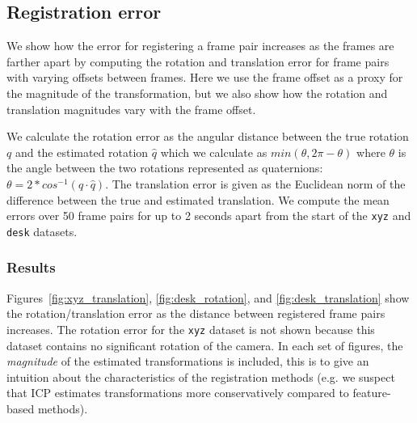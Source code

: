 \documentclass[a4paper]{article}
\begin{document}
\subsection{Registration error}
\label{registration_error}

We show how the error for registering a frame pair increases as the frames are farther apart by computing the rotation and translation error for frame pairs with varying offsets between frames. Here we use the frame offset as a proxy for the magnitude of the transformation, but we also show how the rotation and translation magnitudes vary with the frame offset.

We calculate the rotation error as the angular distance between the true rotation $q$ and the estimated rotation $\hat q$ which we calculate as $min(\theta, 2\pi - \theta)$ where $\theta$ is the angle between the two rotations represented as quaternions: $\theta = 2 * cos^{-1}(q \cdot \hat q)$. %
The translation error is given as the Euclidean norm of the difference between the true and estimated translation. We compute the mean errors over 50 frame pairs for up to 2 seconds apart from the start of the \texttt{xyz} and \texttt{desk} datasets.

\subsubsection{Results}

Figures~\ref{fig:xyz_translation}, \ref{fig:desk_rotation}, and \ref{fig:desk_translation} show the rotation/translation error as the distance between registered frame pairs increases. The rotation error for the \texttt{xyz} dataset is not shown because this dataset contains no significant rotation of the camera. In each set of figures, the \emph{magnitude} of the estimated transformations is included, this is to give an intuition about the characteristics of the registration methods (e.g. we suspect that \ac{ICP} estimates transformations more conservatively compared to feature-based methods). 
\end{document}
